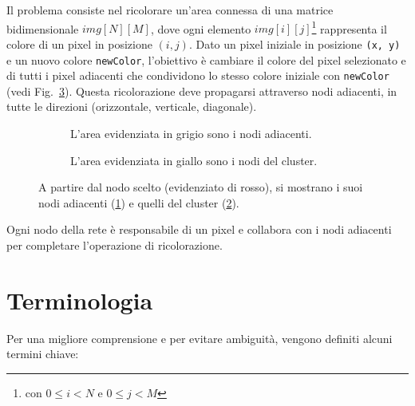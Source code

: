 \documentclass[12pt, a4paper]{report}
\begin{document}
Il problema consiste nel ricolorare un'area connessa di una matrice bidimensionale $img[N][M]$, dove ogni elemento $img[i][j]$\footnote{con $0 \le i < N$ e $0 \le j < M$} rappresenta il colore di un pixel in posizione $(i,j)$. Dato un pixel iniziale in posizione \texttt{(x, y)} e un nuovo colore \texttt{newColor}, l'obiettivo \`e cambiare il colore del pixel selezionato e di tutti i pixel adiacenti che condividono lo stesso colore iniziale con \texttt{newColor} (vedi Fig.~\ref{fig:esempio_nodi}). Questa ricolorazione deve propagarsi attraverso nodi adiacenti, in tutte le direzioni (orizzontale, verticale, diagonale).

\begin{figure}[H]
    \captionsetup{justification=centering, margin=2cm}
    \centering
    \begin{subfigure}{0.48\textwidth}
        \captionsetup{justification=centering, margin=1cm}
        \centering
        
        \caption{L'area evidenziata in grigio sono i nodi adiacenti.}
        \label{fig:nodi_adiacenti}
    \end{subfigure}
    \hfill
    \begin{subfigure}{0.48\textwidth}
        \captionsetup{justification=centering, margin=1cm}
        \centering
        
        \caption{L'area evidenziata in giallo sono i nodi del cluster.}
        \label{fig:nodi_cluster}
    \end{subfigure}
    \caption{A partire dal nodo scelto (evidenziato di rosso), si mostrano i suoi nodi adiacenti (\ref{fig:nodi_adiacenti}) e quelli del cluster (\ref{fig:nodi_cluster}).}
    \label{fig:esempio_nodi}
\end{figure}


Ogni nodo della rete \`e responsabile di un pixel e collabora con i nodi adiacenti per completare l'operazione di ricolorazione.

\section{Terminologia}

Per una migliore comprensione e per evitare ambiguit\`a, vengono definiti alcuni termini chiave:
\end{document}
